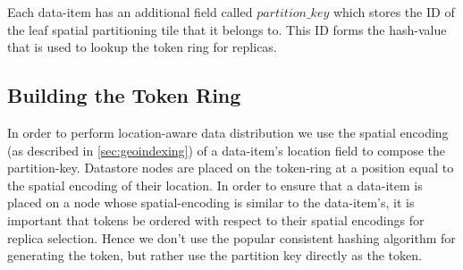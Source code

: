 \par Each data-item has an additional field called $partition\_key$ which stores the ID of the leaf spatial partitioning tile that it belongs to. This ID forms the hash-value that is used to lookup the token ring for replicas. 

\subsection{Building the Token Ring}
\label{sec:building_token_ring}
\par In order to perform location-aware data distribution we use the spatial encoding (as described in \cref{sec:geoindexing}) of a data-item's location field to compose the partition-key. Datastore nodes are placed on the token-ring at a position equal to the spatial encoding of their location. In order to ensure that a data-item is placed on a node whose spatial-encoding is similar to the data-item's, it is important that tokens be ordered with respect to their spatial encodings for replica selection. Hence we don't use the popular consistent hashing algorithm for generating the token, but rather use the partition key directly as the token. 

